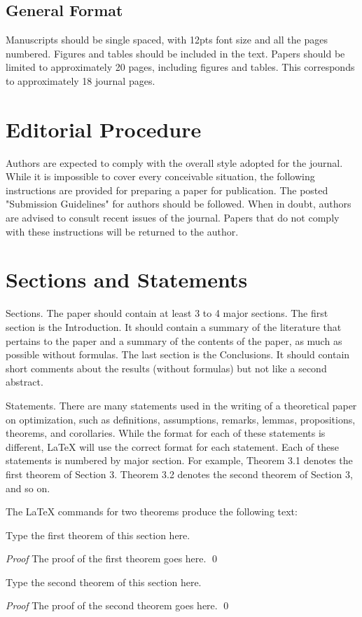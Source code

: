 \documentclass[smallextended,referee,envcountsect,]{svjour3}
\begin{document}
\subsection{General Format}

 Manuscripts should be single spaced, with 12pts font size and all the pages numbered.  Figures and tables should be included in the text.  Papers should be limited to approximately 20 pages,  including figures and tables. This corresponds to approximately 18 journal pages.

\section{Editorial Procedure}

Authors are expected to comply with the overall style adopted for the journal. While it is impossible to cover every conceivable situation, the following instructions are provided for preparing a paper for publication.  The posted "Submission Guidelines" for authors should be followed. When in doubt, authors are advised to consult recent issues of the journal. Papers that do not comply with these instructions will be returned to the author.


\section{Sections and Statements}

Sections. The paper should contain at least 3 to 4 major sections. The first section is the Introduction. It should contain a summary of the literature that pertains to the paper and a summary of the contents of the paper, as much as possible without formulas. The last section is the Conclusions. It should contain short comments about the results (without formulas) but not like a second abstract.

Statements.  There are many statements used in the writing of a theoretical paper on optimization, such as definitions, assumptions,  remarks,  lemmas, propositions, theorems, and corollaries. While the format for each of these statements is different, LaTeX will use the correct format for each statement.  Each of these statements is numbered by major section. For example,  Theorem 3.1 denotes the first theorem of Section 3. Theorem 3.2 denotes the second theorem of Section 3, and so on.

The LaTeX commands for two theorems produce the following text:

\begin{theorem}
Type the first theorem of this section here.
\end{theorem}
{\it Proof}  The proof of the first theorem goes here.
\qed
\begin{theorem}
Type the second theorem of this section here.
\end{theorem}
{\it Proof}  The proof of the second theorem goes here.
\qed
\end{document}
